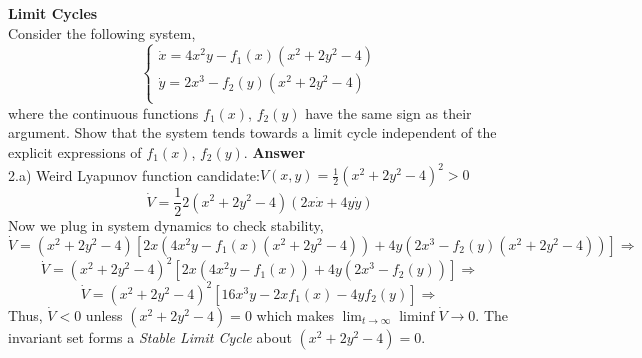 \documentclass{homeworg}
\begin{document}
\exercise
\noindent
\textbf{Limit Cycles}\\
Consider the following system,
\begin{equation*}
  \begin{cases}
    \dot{x} = 4 x^2 y - f_1 (x) \left( x^2 + 2 y^2 -4  \right)\\
    \dot{y} = 2 x^3 - f_2 (y) \left( x^2 + 2 y^2 -4  \right)\\
  \end{cases}
\end{equation*}
where the continuous functions \(f_1 (x)\), \(f_2 (y)\) have the same sign as
their argument. Show that the system tends towards a limit cycle independent
of the explicit expressions of \(f_1 (x)\), \(f_2 (y)\).
\noindent
\textbf{Answer} \\
2.a) Weird Lyapunov function candidate:\(V(x, y)= \frac{1}{2}(x^2 + 2y^2 -4)^2 > 0\)
\begin{equation*}
\dot{V} = \frac{1}{2} 2 (x^2 + 2y^2 -4)(2x \dot{x} + 4y \dot{y})
\end{equation*}
Now we plug in system dynamics to check stability,
\begin{equation*}
  \dot{V}=(x^2+2y^2-4)\left[2x\left(4x^2y-f_1(x)(x^2+2y^2-4)\right)+4y\left(2x^3-f_2(y)(x^2+2y^2-4)\right)\right]\Rightarrow
\end{equation*}
\begin{equation*}
  \dot{V}=(x^2+2y^2-4)^2
  \left[2x\left(4x^2y-f_1(x)\right)+4y\left(2x^3-f_2(y)\right)\right]\Rightarrow
\end{equation*}
\begin{equation*}
  \dot{V}=(x^2+2y^2-4)^2
  \left[
    16x^3y-2xf_1(x)-4yf_2(y)
    \right]\Rightarrow
\end{equation*}
Thus, \(\dot{V} < 0\) unless \( (x^2+2y^2-4) = 0 \) which makes \( \lim_{t\to \infty} \liminf{  \dot{V}} \rightarrow 0\). The invariant set forms a \emph{Stable
Limit Cycle} about \((x^2+2y^2-4)=0\).\\
\end{document}
